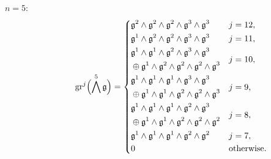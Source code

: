 \begin{description}
  \item[$n=5:$]
        \begin{equation*}
          \operatorname{gr}^{j}\Bigl( \bigwedge^{5}\mathfrak{g} \Bigr) =
          \begin{dcases}
            \mathfrak{g}^{2} \wedge \mathfrak{g}^{2} \wedge \mathfrak{g}^{2} \wedge \mathfrak{g}^{3} \wedge \mathfrak{g}^{3} & j=12,                                                                                                                   \\
            \mathfrak{g}^{1} \wedge \mathfrak{g}^{2} \wedge \mathfrak{g}^{2} \wedge \mathfrak{g}^{3} \wedge \mathfrak{g}^{3} & j=11, \\
            \!\begin{aligned} & \mathfrak{g}^{1} \wedge \mathfrak{g}^{1} \wedge \mathfrak{g}^{2} \wedge \mathfrak{g}^{3} \wedge \mathfrak{g}^{3} \\ & \oplus \mathfrak{g}^{1} \wedge \mathfrak{g}^{2} \wedge \mathfrak{g}^{2} \wedge \mathfrak{g}^{2} \wedge \mathfrak{g}^{3} \end{aligned} & j=10, \\
            \!\begin{aligned} & \mathfrak{g}^{1} \wedge \mathfrak{g}^{1} \wedge \mathfrak{g}^{1} \wedge \mathfrak{g}^{3} \wedge \mathfrak{g}^{3} \\ & \oplus \mathfrak{g}^{1} \wedge \mathfrak{g}^{1} \wedge \mathfrak{g}^{2} \wedge \mathfrak{g}^{2} \wedge \mathfrak{g}^{3} \end{aligned} & j=9, \\
            \!\begin{aligned} & \mathfrak{g}^{1} \wedge \mathfrak{g}^{1} \wedge \mathfrak{g}^{1} \wedge \mathfrak{g}^{2} \wedge \mathfrak{g}^{3} \\ & \oplus \mathfrak{g}^{1} \wedge \mathfrak{g}^{1} \wedge \mathfrak{g}^{2} \wedge \mathfrak{g}^{2} \wedge \mathfrak{g}^{2} \end{aligned} & j=8, \\
            \mathfrak{g}^{1} \wedge \mathfrak{g}^{1} \wedge \mathfrak{g}^{1} \wedge \mathfrak{g}^{2} \wedge \mathfrak{g}^{2}                                                                                                                  & j=7, \\
            0                                                                                                                                                                                                      & \text{otherwise.}
          \end{dcases}
        \end{equation*}


\end{description}
